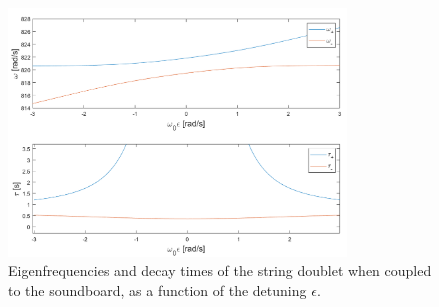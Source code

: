 \documentclass[a4paper]{article}
\begin{document}
\begin{figure}[h]
	\centering
	\includegraphics[width=0.8\textwidth]{doublet.png}
	\caption{Eigenfrequencies and decay times of the string doublet when coupled to the soundboard, as a function of the detuning $\epsilon$.}
	\label{fig:doub}
\end{figure}

\printbibliography
\end{document}
